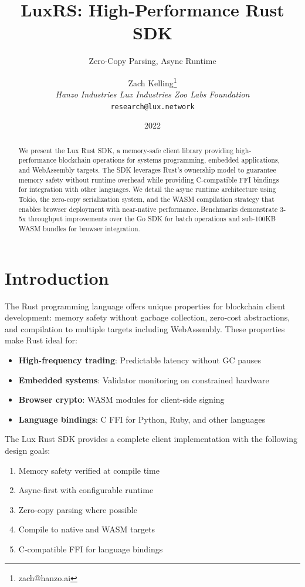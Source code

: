 \documentclass[11pt,twocolumn]{article}
\title{\textbf{LuxRS: High-Performance Rust SDK}}
\subtitle{Zero-Copy Parsing, Async Runtime}
\author{Zach Kelling\thanks{zach@hanzo.ai} \\ \textit{Hanzo Industries \quad Lux Industries \quad Zoo Labs Foundation} \\ \texttt{research@lux.network}}
\date{2022}
\begin{document}
\maketitle

\begin{abstract}
We present the Lux Rust SDK, a memory-safe client library providing high-performance blockchain operations for systems programming, embedded applications, and WebAssembly targets. The SDK leverages Rust's ownership model to guarantee memory safety without runtime overhead while providing C-compatible FFI bindings for integration with other languages. We detail the async runtime architecture using Tokio, the zero-copy serialization system, and the WASM compilation strategy that enables browser deployment with near-native performance. Benchmarks demonstrate 3-5x throughput improvements over the Go SDK for batch operations and sub-100KB WASM bundles for browser integration.
\end{abstract}

\section{Introduction}

The Rust programming language offers unique properties for blockchain client development: memory safety without garbage collection, zero-cost abstractions, and compilation to multiple targets including WebAssembly. These properties make Rust ideal for:

\begin{itemize}
    \item \textbf{High-frequency trading}: Predictable latency without GC pauses
    \item \textbf{Embedded systems}: Validator monitoring on constrained hardware
    \item \textbf{Browser crypto}: WASM modules for client-side signing
    \item \textbf{Language bindings}: C FFI for Python, Ruby, and other languages
\end{itemize}

The Lux Rust SDK provides a complete client implementation with the following design goals:

\begin{enumerate}
    \item Memory safety verified at compile time
    \item Async-first with configurable runtime
    \item Zero-copy parsing where possible
    \item Compile to native and WASM targets
    \item C-compatible FFI for language bindings
\end{enumerate}
\end{document}

